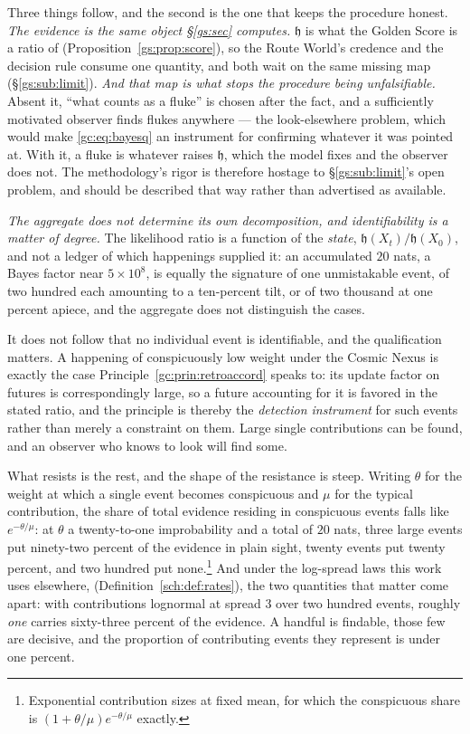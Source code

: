 \documentclass[11pt]{article}
\numberwithin{equation}{section}
\theoremstyle{plain}
\theoremstyle{definition}
\theoremstyle{remark}
\newcommand{\hm}{\mathfrak{h}}
\begin{document}
Three things follow, and the second is the one that keeps the procedure
honest. \emph{The evidence is the same object \S\ref{gs:sec} computes.} $\hm$ is
what the Golden Score is a ratio of (Proposition~\ref{gs:prop:score}),
so the Route World's credence and the decision rule consume one
quantity, and both wait on the same missing map
(\S\ref{gs:sub:limit}). \emph{And that map is what stops the procedure being unfalsifiable.}
Absent it, ``what counts as a fluke'' is chosen after the fact, and a
sufficiently motivated observer finds flukes anywhere --- the
look-elsewhere problem, which would make \eqref{gc:eq:bayesq} an
instrument for confirming whatever it was pointed at. With it, a fluke
is whatever raises $\hm$, which the model fixes and the observer does
not. The methodology's rigor is therefore hostage to
\S\ref{gs:sub:limit}'s open problem, and should be described that way
rather than advertised as available.

\emph{The aggregate does not determine its own decomposition, and
identifiability is a matter of degree.} The likelihood ratio is a
function of the \emph{state}, $\hm(X_t)/\hm(X_0)$, and not a ledger of
which happenings supplied it: an accumulated $20$ nats, a Bayes factor
near $5\times10^{8}$, is equally the signature of one unmistakable
event, of two hundred each amounting to a ten-percent tilt, or of two
thousand at one percent apiece, and the aggregate does not distinguish
the cases.

It does not follow that no individual event is identifiable, and the
qualification matters. A happening of conspicuously low weight under the
Cosmic Nexus is exactly the case
Principle~\ref{gc:prin:retroaccord} speaks to: its update factor on
futures is correspondingly large, so a future accounting for it is
favored in the stated ratio, and the principle is thereby the
\emph{detection instrument} for such events rather than merely a
constraint on them. Large single contributions can be found, and an
observer who knows to look will find some.

What resists is the rest, and the shape of the resistance is steep.
Writing $\theta$ for the weight at which a single event becomes
conspicuous and $\mu$ for the typical contribution, the share of total
evidence residing in conspicuous events falls like $e^{-\theta/\mu}$: at
$\theta$ a twenty-to-one improbability and a total of $20$ nats, three
large events put ninety-two percent of the evidence in plain sight,
twenty events put twenty percent, and two hundred put
none.\footnote{Exponential contribution sizes at fixed mean, for which
the conspicuous share is $(1+\theta/\mu)e^{-\theta/\mu}$ exactly.} And
under the log-spread laws this work uses elsewhere,
(Definition~\ref{sch:def:rates}), the two quantities that matter come
apart: with contributions lognormal at spread $3$ over two hundred
events, roughly \emph{one} carries sixty-three percent of the evidence.
A handful is findable, those few are decisive, and the proportion of
contributing events they represent is under one percent.
\end{document}
